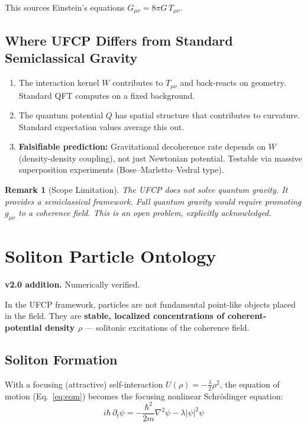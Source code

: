 \documentclass[11pt, a4paper]{article}
\newtheorem{remark}{Remark}[section]
\begin{document}
This sources Einstein's equations $G_{\mu\nu} = 8\pi G\, T_{\mu\nu}$.

\subsection{Where UFCP Differs from Standard Semiclassical Gravity}

\begin{enumerate}[label=\arabic*.]
  \item The interaction kernel $W$ contributes to $T_{\mu\nu}$ and
        back-reacts on geometry. Standard QFT computes on a fixed background.
  \item The quantum potential $Q$ has spatial structure that contributes
        to curvature. Standard expectation values average this out.
  \item \textbf{Falsifiable prediction:} Gravitational decoherence rate
        depends on $W$ (density-density coupling), not just Newtonian
        potential. Testable via massive superposition experiments
        (Bose--Marletto--Vedral type).
\end{enumerate}

\begin{remark}[Scope Limitation]
The UFCP does not solve quantum gravity. It provides a semiclassical
framework. Full quantum gravity would require promoting $g_{\mu\nu}$
to a coherence field. This is an open problem, explicitly acknowledged.
\end{remark}

\section{Soliton Particle Ontology}
\label{sec:soliton}

\textbf{v2.0 addition.} Numerically verified.

In the UFCP framework, particles are not fundamental point-like objects
placed in the field. They are \textbf{stable, localized concentrations
of coherent-potential density $\rho$} --- solitonic excitations of the
coherence field.

\subsection{Soliton Formation}

With a focusing (attractive) self-interaction $U(\rho) = -\frac{\lambda}{2}\rho^2$,
the equation of motion (Eq.~\ref{eq:eom}) becomes the focusing nonlinear
Schr\"odinger equation:
\begin{equation}
  i\hbar\,\partial_t\psi = -\frac{\hbar^2}{2m}\nabla^2\psi - \lambda|\psi|^2\psi
  \label{eq:fnls}
\end{equation}
\end{document}
